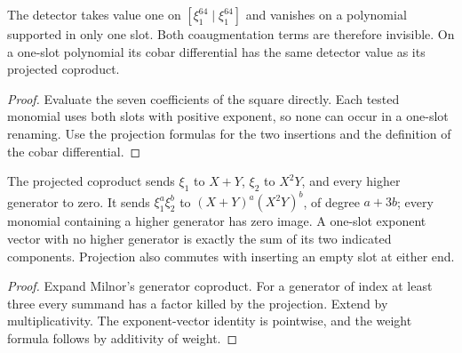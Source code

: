 \begin{proposition}
  \label{prop:h6-cobar-square-detector-basic}
  \leanok
  The detector takes value one on
  $[\xi_1^{64}\mid\xi_1^{64}]$ and vanishes on a polynomial supported
  in only one slot. Both coaugmentation terms are therefore invisible.
  On a one-slot polynomial its cobar differential has the same detector
  value as its projected coproduct.
\end{proposition}
\begin{proof}
  Evaluate the seven coefficients of the square directly. Each tested
  monomial uses both slots with positive exponent, so none can occur in
  a one-slot renaming. Use the projection formulas for the two insertions
  and the definition of the cobar differential.
  \leanok
\end{proof}

\begin{proposition}
  \label{prop:h6-cobar-projection-generators}
  \leanok
  The projected coproduct sends $\xi_1$ to $X+Y$, $\xi_2$ to $X^2Y$,
  and every higher generator to zero. It sends $\xi_1^a\xi_2^b$ to
  $(X+Y)^a(X^2Y)^b$, of degree $a+3b$; every monomial containing a
  higher generator has zero image. A one-slot exponent vector with no
  higher generator is exactly the sum of its two indicated components.
  Projection also commutes with inserting an empty slot at either end.
\end{proposition}
\begin{proof}
  Expand Milnor's generator coproduct. For a generator of index at least
  three every summand has a factor killed by the projection. Extend by
  multiplicativity. The exponent-vector identity is pointwise, and the
  weight formula follows by additivity of weight.
  \leanok
\end{proof}

